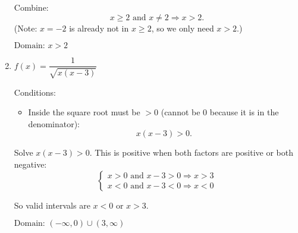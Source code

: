\documentclass[12pt]{article}
\begin{document}
\begin{enumerate}
  Combine:
  \[
  x \ge 2 \text{ and } x \ne 2 \Rightarrow x > 2.
  \]
  (Note: \(x = -2\) is already not in \(x \ge 2\), so we only need \(x > 2.\))

  \(\boxed{\text{Domain: } x > 2}\)

  \item \(f(x) = \dfrac{1}{\sqrt{x(x - 3)}}\)

  Conditions:
  \begin{itemize}
    \item Inside the square root must be \(> 0\) (cannot be 0 because it is in the denominator):
    \[
    x(x - 3) > 0.
    \]
  \end{itemize}

  Solve \(x(x - 3) > 0\). This is positive when both factors are positive or both negative:
  \[
  \begin{cases}
  x > 0 \text{ and } x - 3 > 0 \Rightarrow x > 3 \\
  x < 0 \text{ and } x - 3 < 0 \Rightarrow x < 0
  \end{cases}
  \]

  So valid intervals are \(x < 0\) or \(x > 3.\)

  \(\boxed{\text{Domain: } (-\infty,0) \cup (3,\infty)}\)
\end{enumerate}
\end{document}
